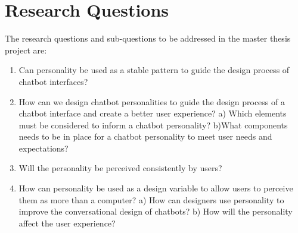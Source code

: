 \vspace{5mm} %

\section{Research Questions}

The research questions and sub-questions to be addressed in the master thesis project are:

\begin{enumerate}
    \item Can personality be used as a stable pattern to guide the design process of chatbot interfaces?
    \item How can we design chatbot personalities to guide the design process of a chatbot interface and create a better user experience? 
        \subitem a) Which elements must be considered to inform a chatbot personality?
        \subitem b)What components needs to be in place for a chatbot personality to meet user needs and expectations?
    \item Will the personality be perceived consistently by users?
    \item How can personality be used as a design variable to allow users to perceive them as more than a computer?
        \subitem a) How can designers use personality to improve the conversational design of chatbots? %
        \subitem b) How will the personality affect the user experience? %
\end{enumerate}

\vspace{5mm} %

